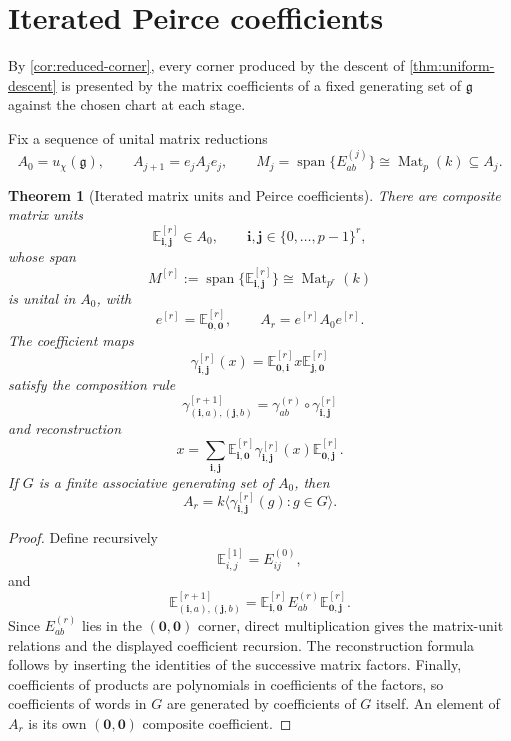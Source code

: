 \documentclass[11pt,reqno]{amsart}
\newtheorem{theorem}{Theorem}[section]
\theoremstyle{definition}
\theoremstyle{remark}
\theoremstyle{definition}
\newcommand{\Mat}{\operatorname{Mat}}
\newcommand{\spn}{\operatorname{span}}
\begin{document}
\section{Iterated Peirce coefficients}\label{sec:iterated}

By \cref{cor:reduced-corner}, every corner produced by the descent of
\cref{thm:uniform-descent} is presented by
the matrix coefficients of a fixed generating set of $\mathfrak g$ against the
chosen chart at each stage.

Fix a sequence of unital matrix reductions
\[
 A_0=u_\chi(\mathfrak g),
 \qquad A_{j+1}=e_jA_je_j,
 \qquad
 M_j=\spn\{E^{(j)}_{ab}\}\cong\Mat_p(k)\subseteq A_j.
\]

\begin{theorem}[Iterated matrix units and Peirce coefficients]\label{thm:composite-coeff}
There are composite matrix units
\[
 \mathbb E^{[r]}_{\mathbf i,\mathbf j}\in A_0,
 \qquad \mathbf i,\mathbf j\in\{0,\ldots,p-1\}^r,
\]
whose span
\[
 M^{[r]}:=\spn\{\mathbb E^{[r]}_{\mathbf i,\mathbf j}\}
 \cong\Mat_{p^r}(k)
\]
is unital in $A_0$, with
\[
 e^{[r]}=\mathbb E^{[r]}_{\mathbf 0,\mathbf 0},
 \qquad A_r=e^{[r]}A_0e^{[r]}.
\]
The coefficient maps
\[
 \gamma^{[r]}_{\mathbf i,\mathbf j}(x)
 =\mathbb E^{[r]}_{\mathbf0,\mathbf i}
 x\mathbb E^{[r]}_{\mathbf j,\mathbf0}
\]
satisfy the composition rule
\[
 \gamma^{[r+1]}_{(\mathbf i,a),(\mathbf j,b)}
 =\gamma^{(r)}_{ab}\circ\gamma^{[r]}_{\mathbf i,\mathbf j}
\]
and reconstruction
\[
 x=\sum_{\mathbf i,\mathbf j}
 \mathbb E^{[r]}_{\mathbf i,\mathbf0}
 \gamma^{[r]}_{\mathbf i,\mathbf j}(x)
 \mathbb E^{[r]}_{\mathbf0,\mathbf j}.
\]
If $G$ is a finite associative generating set of $A_0$, then
\[
 A_r=k\Big\langle
 \gamma^{[r]}_{\mathbf i,\mathbf j}(g):
 g\in G
 \Big\rangle.
\]
\end{theorem}

\begin{proof}
Define recursively
\[
 \mathbb E^{[1]}_{i,j}=E^{(0)}_{ij},
\]
and
\[
 \mathbb E^{[r+1]}_{(\mathbf i,a),(\mathbf j,b)}
 =\mathbb E^{[r]}_{\mathbf i,\mathbf0}
 E^{(r)}_{ab}
 \mathbb E^{[r]}_{\mathbf0,\mathbf j}.
\]
Since $E^{(r)}_{ab}$ lies in the $(\mathbf0,\mathbf0)$ corner, direct
multiplication gives the matrix-unit relations and the displayed coefficient
recursion.  The reconstruction formula follows by inserting the identities
of the successive matrix factors.  Finally, coefficients of products are
polynomials in coefficients of the factors, so coefficients of words in $G$
are generated by coefficients of $G$ itself.  An element of $A_r$ is its own
$(\mathbf0,\mathbf0)$ composite coefficient.
\end{proof}
\end{document}
